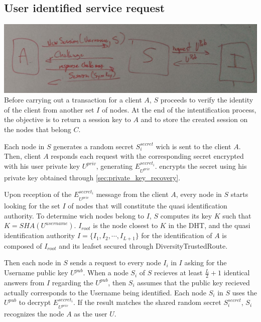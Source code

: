 \subsection{User identified service request}
\includegraphics[width=14cm]{../img/session_creation_protocol_mockup}\\

Before carrying out a transaction for a client $A$, $S$ proceeds to
verify the identity of the client from another set $I$ of nodes. At the end of
the intentification process, the objective is to return a session key to $A$
and to store the created session on the nodes that belong $C$.

Each node in $S$ generates a random secret $S^{secret}_i$ wich is sent to the
client $A$. Then, client $A$ responds each request with the corresponding secret
encrypted with his user private key $U^{priv}$, generating
$E^{secret_i}_{U^{priv}}$. 
encrypts the secret using his private key obtained through
\ref{sec:private_key_recovery}.

Upon reception of the $E^{secret_i}_{U^{priv}}$ message from the client $A$, every node in $S$
starts looking for the set $I$ of nodes that will constitute the quasi
identification authority. To determine wich nodes belong to $I$, $S$ computes
its key $K$ such that $K = SHA(U^{username})$. $I_{root}$ is the node closest
to $K$ in the DHT, and the quasi identification authority $I = \{ I_1, I_2,
\cdots, I_{L+1}\}$ for the identification of $A$ is composed of $I_{root}$
and its leafset secured through DiversityTrustedRoute.

Then each node in $S$ sends a request to every node $I_i$ in $I$ asking for the Username public key $U^{pub}$. When a node
$S_i$ of $S$ recieves at least $\frac{L}{2} + 1$ identical answers from
$I$ regarding the $U^{pub}$, then $S_i$ assumes that the public key recieved
actually corresponds to the Username being identified. Each node $S_i$ in $S$
uses the $U^{pub}$ to decrypt $E^{secret_i}_{U^{priv}}$. If the result matches
the shared random secret $S^{secret}_i$, $S_i$ recognizes the node $A$ as the
user $U$.


